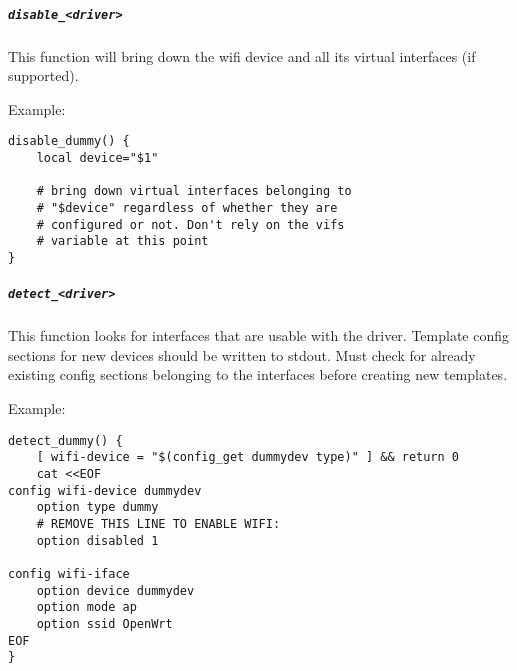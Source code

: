 \subparagraph{\texttt{disable\_<driver>}}

This function will bring down the wifi device and all its virtual interfaces (if supported).

Example:
\begin{Verbatim}
disable_dummy() {
	local device="$1"

	# bring down virtual interfaces belonging to
	# "$device" regardless of whether they are
	# configured or not. Don't rely on the vifs
	# variable at this point
}
\end{Verbatim}

\subparagraph{\texttt{detect\_<driver>}}

This function looks for interfaces that are usable with the driver. Template config sections
for new devices should be written to stdout. Must check for already existing config sections
belonging to the interfaces before creating new templates.

Example:
\begin{Verbatim}
detect_dummy() {
	[ wifi-device = "$(config_get dummydev type)" ] && return 0
	cat <<EOF
config wifi-device dummydev
	option type dummy
	# REMOVE THIS LINE TO ENABLE WIFI:
	option disabled 1

config wifi-iface
	option device dummydev
	option mode ap
	option ssid OpenWrt
EOF
}
\end{Verbatim}
